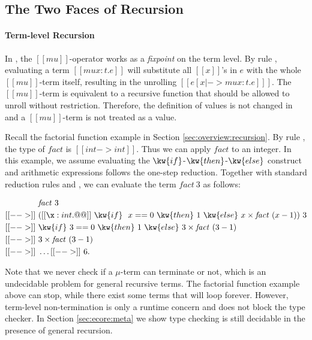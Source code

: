 \subsection{The Two Faces of Recursion}
\label{sec:ecore:recur}
\paragraph{Term-level Recursion}

In \name, the $[[mu]]$-operator works as a \emph{fixpoint} on the term
level. By rule , evaluating a term $[[mu x:t.e]]$ will
substitute all $[[x]]$'s in $e$ with the whole $[[mu]]$-term itself,
resulting in the unrolling $[[e [x |-> mu x:t.e] ]]$. The
$[[mu]]$-term is equivalent to a recursive function that should be
allowed to unroll without restriction. Therefore, the definition of
values is not changed in \name and a $[[mu]]$-term is not treated as a
value. 

Recall the factorial function example in Section
\ref{sec:overview:recursion}.
By rule , the type of $\mathit{fact}$ is $[[int ->
    int]]$. Thus we can apply $\mathit{fact}$ to an integer.
In this example, we assume
evaluating the $\kw{if}$-$\kw{then}$-$\kw{else}$ construct and 
arithmetic expressions follows the one-step
reduction. Together with standard reduction rules  and
, we can evaluate the term $\mathit{fact}~3$ as
follows:
\begin{spacing}{0.7}
\small
\begin{align*}
    &\mathit{fact}~3 \\ [[-->]]~& ([[\x : int . @@]]~\kw{if}~
  ~x==0~\kw{then}~1~\kw{else}~x \times \mathit{fact}~(x - 1))~3
  \\ [[-->]]~ & \kw{if}~3==0~\kw{then}~1~\kw{else}~3 \times
  \mathit{fact}~(3 - 1) \\ [[-->]]~& 3 \times \mathit{fact}~(3-1)
  \\ [[-->]]~& \dots [[-->]]~ 6. 
\end{align*}
\end{spacing}

Note that we never check if a $\mu$-term can terminate or not, which
is an undecidable problem for general recursive terms. The
factorial function example above can stop, while there exist some
terms that will loop forever. However, term-level non-termination is
only a runtime concern and does not block the type checker. In Section
\ref{sec:ecore:meta} we show type checking \name is still decidable
in the presence of general recursion.

